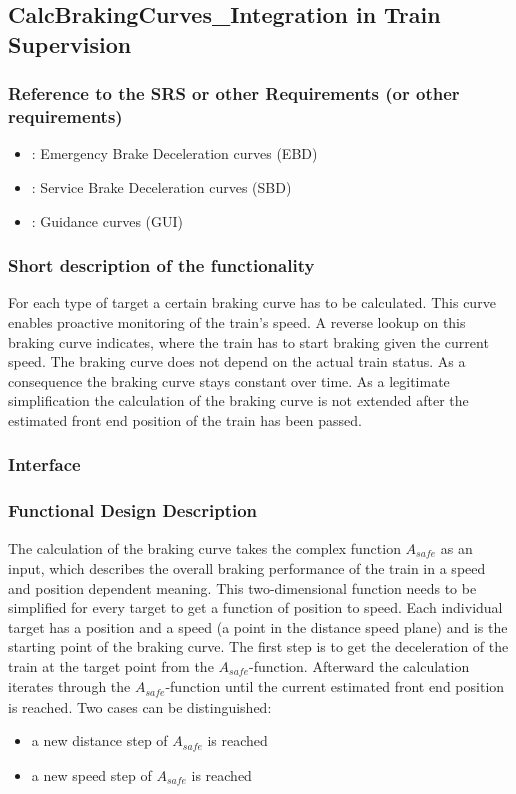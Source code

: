 \subsection{CalcBrakingCurves\_Integration in Train Supervision}
\subsubsection{Reference to the SRS or other Requirements (or other requirements)}
\begin{itemize}
	\item \cite[Chapt.~3.13.8.3]{subset-026}: Emergency Brake Deceleration curves (EBD)
	\item \cite[Chapt.~3.13.8.4]{subset-026}: Service Brake Deceleration curves (SBD)
	\item \cite[Chapt.~3.13.8.5]{subset-026}: Guidance curves (GUI)
\end{itemize}

\subsubsection{Short description of the functionality}
For each type of target a certain braking curve has to be calculated. This curve enables proactive monitoring of the train's speed. A reverse lookup on this braking curve indicates, where the train has to start braking given the current speed. The braking curve does not depend on the actual train status. As a consequence the braking curve stays constant over time. As a legitimate simplification the calculation of the braking curve is not extended after the estimated front end position of the train has been passed.

\subsubsection{Interface}

\subsubsection{Functional Design Description}
The calculation of the braking curve takes the complex function $A_{\mathit{safe}}$ as an input, which describes the overall braking performance of the train in a speed and position dependent meaning. This two-dimensional function needs to be simplified for every target to get a function of position to speed. Each individual target has a position and a speed (a point in the distance speed plane) and is the starting point of the braking curve. The first step is to get the deceleration of the train at the target point from the $A_{\mathit{safe}}$-function. Afterward the calculation iterates through the $A_{\mathit{safe}}$-function until the current estimated front end position is reached. Two cases can be distinguished:
\begin{itemize}
\item a new distance step of $A_{\mathit{safe}}$ is reached
\item a new speed step of $A_{\mathit{safe}}$ is reached
\end{itemize}

